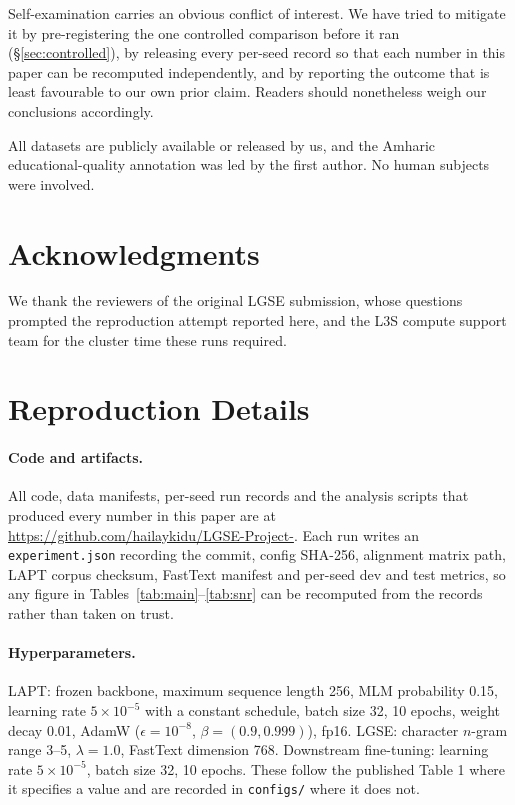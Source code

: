 \documentclass[11pt]{article}
\begin{document}
Self-examination carries an obvious conflict of interest. We have tried to
mitigate it by pre-registering the one controlled comparison before it ran
(\S\ref{sec:controlled}), by releasing every per-seed record so that each
number in this paper can be recomputed independently, and by reporting the
outcome that is least favourable to our own prior claim. Readers should
nonetheless weigh our conclusions accordingly.

All datasets are publicly available or released by us, and the Amharic
educational-quality annotation was led by the first author. No human subjects
were involved.

\section*{Acknowledgments}

We thank the reviewers of the original LGSE submission, whose questions
prompted the reproduction attempt reported here, and the L3S compute support
team for the cluster time these runs required.



\appendix

\section{Reproduction Details}
\label{app:repro}

\paragraph{Code and artifacts.} All code, data manifests, per-seed run
records and the analysis scripts that produced every number in this paper are
at \url{https://github.com/hailaykidu/LGSE-Project-}. Each run writes an
\texttt{experiment.json} recording the commit, config SHA-256, alignment
matrix path, LAPT corpus checksum, FastText manifest and per-seed dev and
test metrics, so any figure in Tables~\ref{tab:main}--\ref{tab:snr} can be
recomputed from the records rather than taken on trust.

\paragraph{Hyperparameters.} LAPT: frozen backbone, maximum sequence length
256, MLM probability 0.15, learning rate $5\times10^{-5}$ with a constant
schedule, batch size 32, 10 epochs, weight decay 0.01, AdamW
($\epsilon = 10^{-8}$, $\beta = (0.9, 0.999)$), fp16. LGSE: character
$n$-gram range 3--5, $\lambda = 1.0$, FastText dimension 768. Downstream
fine-tuning: learning rate $5\times10^{-5}$, batch size 32, 10 epochs. These
follow the published Table 1 where it specifies a value and are recorded in
\texttt{configs/} where it does not.
\end{document}
